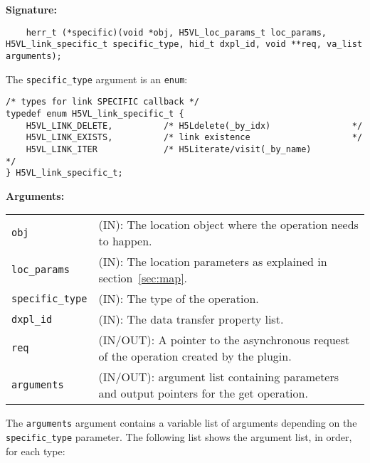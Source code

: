 \begin{mdframed}[style=bgbox]
\textbf{Signature:}
\begin{lstlisting}
	herr_t (*specific)(void *obj, H5VL_loc_params_t loc_params, H5VL_link_specific_t specific_type, hid_t dxpl_id, void **req, va_list arguments);
\end{lstlisting}

The \texttt{specific\_type} argument is an \texttt{enum}:
\begin{lstlisting}
/* types for link SPECIFIC callback */
typedef enum H5VL_link_specific_t {
    H5VL_LINK_DELETE,          /* H5Ldelete(_by_idx)                */
    H5VL_LINK_EXISTS,          /* link existence                    */
    H5VL_LINK_ITER             /* H5Literate/visit(_by_name)              */
} H5VL_link_specific_t;
\end{lstlisting}

\textbf{Arguments:}\\
\begin{tabular}{l p{10cm}}
  \texttt{obj} & (IN): The location object  where the operation needs to happen.\\
  \texttt{loc\_params} & (IN): The location parameters as explained in section~\ref{sec:map}.\\
  \texttt{specific\_type} & (IN): The type of the operation.\\
  \texttt{dxpl\_id} & (IN): The data transfer property list.\\
  \texttt{req} & (IN/OUT): A pointer to the asynchronous request of the
  operation created by the plugin.\\
  \texttt{arguments} & (IN/OUT): argument list containing parameters and
  output pointers for the get operation. \\
\end{tabular}
\end{mdframed}

The \texttt{arguments} argument contains a variable list of arguments
depending on the \texttt{specific\_type} parameter. The following list shows
the argument list, in order, for each type:

